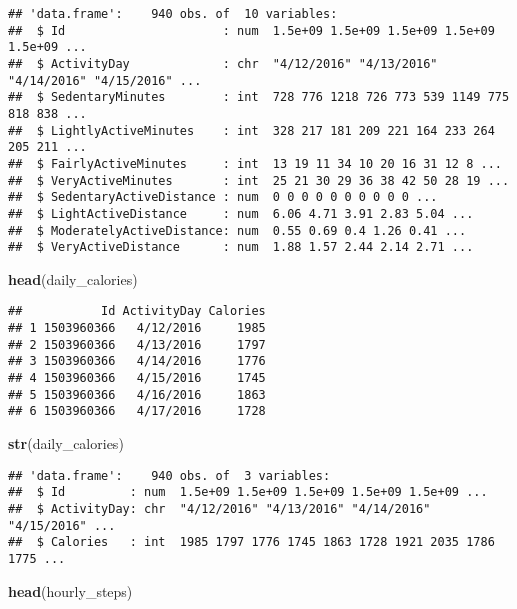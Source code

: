 \documentclass[
]{article}
\newenvironment{Shaded}{\begin{snugshade}}{\end{snugshade}}
\newcommand{\FunctionTok}[1]{\textcolor[rgb]{0.13,0.29,0.53}{\textbf{#1}}}
\newcommand{\NormalTok}[1]{#1}
\begin{document}
\begin{verbatim}
## 'data.frame':    940 obs. of  10 variables:
##  $ Id                      : num  1.5e+09 1.5e+09 1.5e+09 1.5e+09 1.5e+09 ...
##  $ ActivityDay             : chr  "4/12/2016" "4/13/2016" "4/14/2016" "4/15/2016" ...
##  $ SedentaryMinutes        : int  728 776 1218 726 773 539 1149 775 818 838 ...
##  $ LightlyActiveMinutes    : int  328 217 181 209 221 164 233 264 205 211 ...
##  $ FairlyActiveMinutes     : int  13 19 11 34 10 20 16 31 12 8 ...
##  $ VeryActiveMinutes       : int  25 21 30 29 36 38 42 50 28 19 ...
##  $ SedentaryActiveDistance : num  0 0 0 0 0 0 0 0 0 0 ...
##  $ LightActiveDistance     : num  6.06 4.71 3.91 2.83 5.04 ...
##  $ ModeratelyActiveDistance: num  0.55 0.69 0.4 1.26 0.41 ...
##  $ VeryActiveDistance      : num  1.88 1.57 2.44 2.14 2.71 ...
\end{verbatim}

\begin{Shaded}
\begin{Highlighting}[]
\FunctionTok{head}\NormalTok{(daily\_calories)}
\end{Highlighting}
\end{Shaded}

\begin{verbatim}
##           Id ActivityDay Calories
## 1 1503960366   4/12/2016     1985
## 2 1503960366   4/13/2016     1797
## 3 1503960366   4/14/2016     1776
## 4 1503960366   4/15/2016     1745
## 5 1503960366   4/16/2016     1863
## 6 1503960366   4/17/2016     1728
\end{verbatim}

\begin{Shaded}
\begin{Highlighting}[]
\FunctionTok{str}\NormalTok{(daily\_calories)}
\end{Highlighting}
\end{Shaded}

\begin{verbatim}
## 'data.frame':    940 obs. of  3 variables:
##  $ Id         : num  1.5e+09 1.5e+09 1.5e+09 1.5e+09 1.5e+09 ...
##  $ ActivityDay: chr  "4/12/2016" "4/13/2016" "4/14/2016" "4/15/2016" ...
##  $ Calories   : int  1985 1797 1776 1745 1863 1728 1921 2035 1786 1775 ...
\end{verbatim}

\begin{Shaded}
\begin{Highlighting}[]
\FunctionTok{head}\NormalTok{(hourly\_steps)}
\end{Highlighting}
\end{Shaded}
\end{document}
